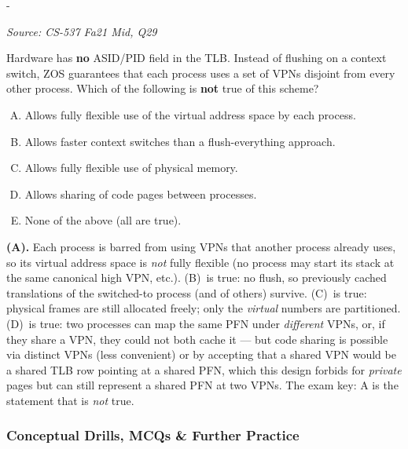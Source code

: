 \documentclass[11pt,a4paper]{article}
\makeatletter
\newcommand{\keepspace}[1]{\par\penalty-100\begingroup
  \setlength{\dimen@}{#1}\dimen@ii\pagegoal\advance\dimen@ii-\pagetotal
  \ifdim\dimen@>\dimen@ii\ifdim\dimen@ii>\z@\vfil\fi\break\fi\endgroup}
\newcounter{qn}[section]
\newenvironment{Qn}[4]{%
  \refstepcounter{qn}\keepspace{7\baselineskip}%
  \begin{tcolorbox}[qboxstyle, title={Q\thesection.\theqn\ \ [#1 \textbar\ #2]\ \ #4}]%
  {\footnotesize\color{g3}\textit{Source: #3}}\par\smallskip%
}{%
  \end{tcolorbox}%
}
\newenvironment{Sol}{%
  \begin{tcolorbox}[sboxstyle, title={Solution}]%
}{%
  \end{tcolorbox}\vspace{0.35em}%
}
\makeatother
\begin{document}
\begin{Qn}{Medium-Hard}{Lect 13}{CS-537 Fa21 Mid, Q29}{Unique VPNs instead of ASID (no TLB flush)}
Hardware has \textbf{no} ASID/PID field in the TLB. Instead of flushing
on a context switch, ZOS guarantees that each process uses a set of VPNs
disjoint from every other process. Which of the following is \textbf{not}
true of this scheme?
\begin{enumerate}[(A)]
\item Allows fully flexible use of the virtual address space by each process.
\item Allows faster context switches than a flush-everything approach.
\item Allows fully flexible use of physical memory.
\item Allows sharing of code pages between processes.
\item None of the above (all are true).
\end{enumerate}
\end{Qn}
\begin{Sol}
\textbf{(A).} Each process is barred from using VPNs that another process
already uses, so its virtual address space is \emph{not} fully flexible
(no process may start its stack at the same canonical high VPN, etc.).
(B)~is true: no flush, so previously cached translations of the
switched-to process (and of others) survive. (C)~is true: physical
frames are still allocated freely; only the \emph{virtual} numbers are
partitioned. (D)~is true: two processes can map the same PFN under
\emph{different} VPNs, or, if they share a VPN, they could not both
cache it --- but code sharing is possible via distinct VPNs (less
convenient) or by accepting that a shared VPN would be a shared TLB
row pointing at a shared PFN, which this design forbids for
\emph{private} pages but can still represent a shared PFN at two VPNs.
The exam key: A is the statement that is \emph{not} true.
\end{Sol}

\subsubsection*{Conceptual Drills, MCQs \& Further Practice}
\end{document}
